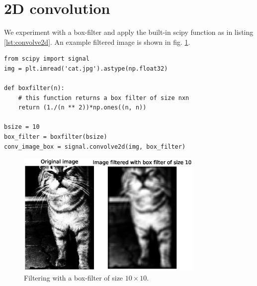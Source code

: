 \documentclass[12pt]{article}
\begin{document}
\section{2D convolution}
We experiment with a box-filter and apply the built-in scipy function as in listing \ref{lst:convolve2d}. An example filtered image is shown in fig. \ref{fig:boxfilter}.

\begin{lstlisting}[style=Python,
  caption={My 2D convolution approach.},
  label={lst:convolve2d}]
from scipy import signal
img = plt.imread('cat.jpg').astype(np.float32)

def boxfilter(n):
    # this function returns a box filter of size nxn
    return (1./(n ** 2))*np.ones((n, n))

bsize = 10
box_filter = boxfilter(bsize)
conv_image_box = signal.convolve2d(img, box_filter)
\end{lstlisting}

\begin{figure}
\centering
\includegraphics[width=0.8\textwidth]{pics/q2}
\caption{Filtering with a box-filter of size $10 \times 10$.}
\label{fig:boxfilter}
\end{figure}
\end{document}
